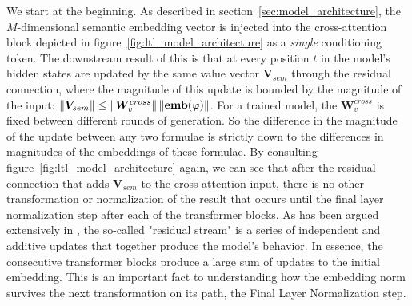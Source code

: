 \documentclass[titlepage,a4paper,11pt]{report}
\begin{document}
    We start at the beginning. As described in section~\ref{sec:model_architecture}, the $M$-dimensional semantic embedding vector is injected into the cross-attention block depicted in figure~\ref{fig:ltl_model_architecture} as a \emph{single} conditioning token. The downstream result of this is that at every position $t$ in the model's hidden states are updated by the same value vector $\bm V_{sem}$ through the residual connection, where the magnitude of this update is  bounded by the magnitude of the input: $\Vert \bm V_{sem} \Vert \leq \Vert \bm W^{cross}_v \Vert \, \Vert \textbf{emb}(\varphi) \Vert$. For a trained model, the $\bm{W}^{cross}_v$ is fixed between different rounds of generation. So the difference in the magnitude of the update between any two formulae is strictly down to the differences in magnitudes of the embeddings of these formulae. By consulting figure~\ref{fig:ltl_model_architecture} again, we can see that after the residual connection that adds $\bm V_{sem}$ to the cross-attention input, there is no other transformation or normalization of the result that occurs until the final layer normalization step after each of the transformer blocks. As has been argued extensively in \cite{elhage_mathematical_2021}, the so-called "residual stream" is a series of independent and additive updates that together produce the model's behavior. In essence, the consecutive transformer blocks produce a large sum of updates to the initial embedding. This is an important fact to understanding how the embedding norm survives the next transformation on its path, the Final Layer Normalization step.
\end{document}
